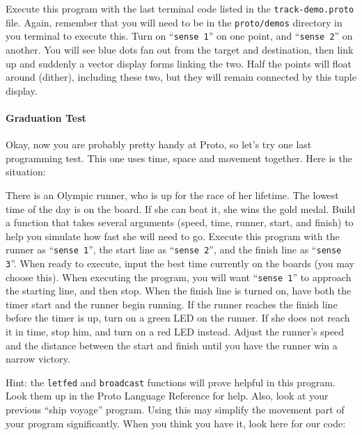 \documentclass{article}
\newcommand\var[1]{{\tt #1}}
\newcommand\qvar[1]{``{\tt #1}''}
\begin{document}
Execute this program with the last terminal code listed in the
\var{track-demo.proto} file.  Again, remember that you will need to be
in the \var{proto/demos} directory in you terminal to execute this.
Turn on \qvar{sense 1} on one point, and \qvar{sense 2} on another.
You will see blue dots fan out from the target and destination, then
link up and suddenly a vector display forms linking the two.  Half the
points will float around (dither), including these two, but they will
remain connected by this tuple display.


\paragraph{Graduation Test}

Okay, now you are probably pretty handy at Proto, so let's try one
last programming test.  This one uses time, space and movement
together.  Here is the situation:

There is an Olympic runner, who is up for the race of her lifetime.
The lowest time of the day is on the board.  If she can beat it, she
wins the gold medal.  Build a function that takes several arguments
(speed, time, runner, start, and finish) to help you simulate how fast
she will need to go.  Execute this program with the runner as
\qvar{sense 1}, the start line as \qvar{sense 2}, and the finish line
as \qvar{sense 3}.  When ready to execute, input the best time
currently on the boards (you may choose this).  When executing the
program, you will want \qvar{sense 1} to approach the starting line,
and then stop.  When the finish line is turned on, have both the timer
start and the runner begin running.  If the runner reaches the finish
line before the timer is up, turn on a green LED on the runner.  If
she does not reach it in time, stop him, and turn on a red LED
instead.  Adjust the runner's speed and the distance between the start
and finish until you have the runner win a narrow victory.

Hint: the \var{letfed} and \var{broadcast} functions will prove
helpful in this program.  Look them up in the Proto Language Reference
for help.  Also, look at your previous ``ship voyage'' program.  Using
this may simplify the movement part of your program significantly.
When you think you have it, look here for our code:
\end{document}
